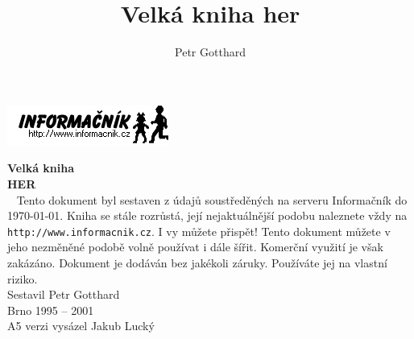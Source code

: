 \documentclass[A5paper,8pt,openany,twoside]{book}
\author{Petr Gotthard}
\title{Velká kniha her}
\begin{document}
\pagestyle{empty}%

{\raggedleft
\includegraphics{inflogo}\\[3 cm]
}

{\centering
{
 \fontsize{2 cm}{2.4 cm}%
 \bfseries%
 Velká kniha
}\\[5mm]
{
 \fontsize{5.5 cm}{6.6 cm}%
 \bfseries%
 HER
}\\[8.5cm]
}
\cleardoublepage %
\pagestyle{fancy} %
~
\vfill
Tento dokument byl sestaven z údajů soustředěných na serveru
Informačník do \today. Kniha se stále rozrůstá, její nejaktuálnější
podobu naleznete vždy na
{\tt http://www.informacnik.cz}.
I vy můžete přispět!
Tento dokument můžete v jeho nezměněné podobě volně používat i dále šířit. 
Komerční využití je však zakázáno.
Dokument je dodáván bez jakékoli záruky. Používáte jej na vlastní
riziko.\\[1 cm]

{\centering
Sestavil Petr Gotthard\\
Brno 1995 -- 2001\\
A5 verzi vysázel Jakub Lucký
\\
}

\cleardoublepage

\renewcommand\multicolumntoc{2}
\tableofcontents
\cleardoublepage

\renewcommand\Large{\fontfamily{phv}\fontsize{10}{12}\selectfont}
\renewcommand\large{\fontfamily{phv}\fontsize{7}{8.4}\selectfont}


\newcommand{\nadpis}[2]{%
 \vskip 3ex%
 \addtocounter{#2}{1}%
 \noindent%
 {
  \fontfamily{phv}%
  \fontsize{7}{8.4}%
  \bfseries%
  \arabic{#2}.%
  \hspace{1.5mm}#1%
 }%
 \nopagebreak%
 \vskip 1ex%
}

\newenvironment{intabular}[1]{%
 \noindent%
 \begin{tabular}{#1}%
}{%
 \end{tabular}%
}

\newenvironment{intabularx}[1]{%
 \noindent%
 \tabularx{\columnwidth}{#1}%
}{%
 \endtabularx%
}
\end{document}
